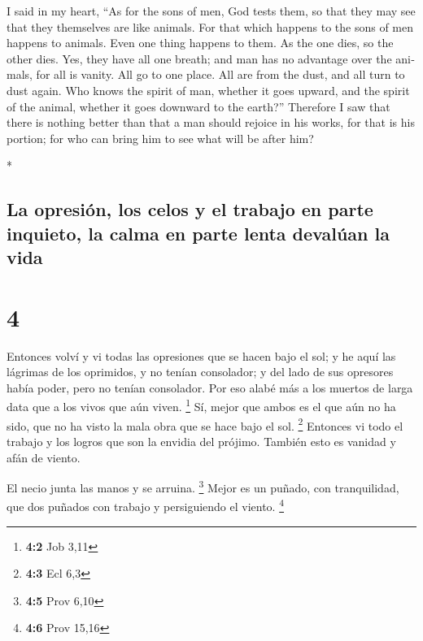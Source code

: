 \begin{paracol}{2}
\begin{otherlanguage}{english}
 I said in my heart, ``As for the sons of men, God tests
them, so that they may see that they themselves are like animals.
 For that which happens to the sons of men happens to
animals. Even one thing happens to them. As the one dies, so the other
dies. Yes, they have all one breath; and man has no advantage over the
animals, for all is vanity.  All go to one place. All are
from the dust, and all turn to dust again.  Who knows the
spirit of man, whether it goes upward, and the spirit of the animal,
whether it goes downward to the earth?''  Therefore I saw
that there is nothing better than that a man should rejoice in his
works, for that is his portion; for who can bring him to see what will
be after him?

\end{otherlanguage}

\switchcolumn[0]*

\hypertarget{la-opresiuxf3n-los-celos-y-el-trabajo-en-parte-inquieto-la-calma-en-parte-lenta-devaluxfaan-la-vida}{%
\subsection{La opresión, los celos y el trabajo en parte inquieto, la
calma en parte lenta devalúan la
vida}\label{la-opresiuxf3n-los-celos-y-el-trabajo-en-parte-inquieto-la-calma-en-parte-lenta-devaluxfaan-la-vida}}

\hypertarget{section-6}{%
\section{4}\label{section-6}}

 Entonces volví y vi todas las opresiones que se hacen
bajo el sol; y he aquí las lágrimas de los oprimidos, y no tenían
consolador; y del lado de sus opresores había poder, pero no tenían
consolador.  Por eso alabé más a los muertos de larga data
que a los vivos que aún viven. \footnote{\textbf{4:2} Job 3,11}
 Sí, mejor que ambos es el que aún no ha sido, que no ha
visto la mala obra que se hace bajo el sol. \footnote{\textbf{4:3} Ecl
  6,3}  Entonces vi todo el trabajo y los logros que son
la envidia del prójimo. También esto es vanidad y afán de viento.

 El necio junta las manos y se arruina. \footnote{\textbf{4:5}
  Prov 6,10}  Mejor es un puñado, con tranquilidad, que
dos puñados con trabajo y persiguiendo el viento. \footnote{\textbf{4:6}
  Prov 15,16}


\end{paracol}
